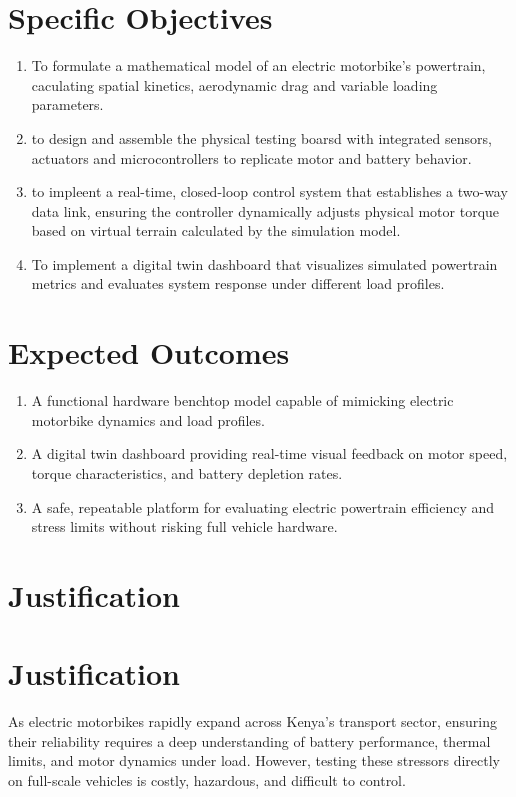 \documentclass[12pt, a4paper]{article}
\begin{document}
\section{Specific Objectives}
\begin{enumerate}
    \item To formulate a mathematical model of an electric motorbike's powertrain, caculating spatial kinetics, aerodynamic drag and variable loading parameters.
    \item to design and assemble the physical testing boarsd with integrated sensors, actuators and microcontrollers to replicate motor and battery behavior.
    \item to impleent a real-time, closed-loop control system that establishes a two-way data link, ensuring the controller dynamically adjusts physical motor torque based on virtual terrain calculated by the simulation model.
    \item To implement a digital twin dashboard that visualizes simulated powertrain metrics and evaluates system response under different load profiles.
  \end{enumerate}

\section{Expected Outcomes}
\begin{enumerate}
    \item  A functional hardware benchtop model capable of mimicking electric motorbike dynamics and load profiles.
    \item A digital twin dashboard providing real-time visual feedback on motor speed, torque characteristics, and battery depletion rates.
    \item A safe, repeatable platform for evaluating electric powertrain efficiency and stress limits without risking full vehicle hardware.
\end{enumerate}

\section{Justification}
\section{Justification}
As electric motorbikes rapidly expand across Kenya's transport sector, ensuring their reliability requires a deep understanding of battery performance, thermal limits, and motor dynamics under load. However, testing these stressors directly on full-scale vehicles is costly, hazardous, and difficult to control. 
\end{document}
